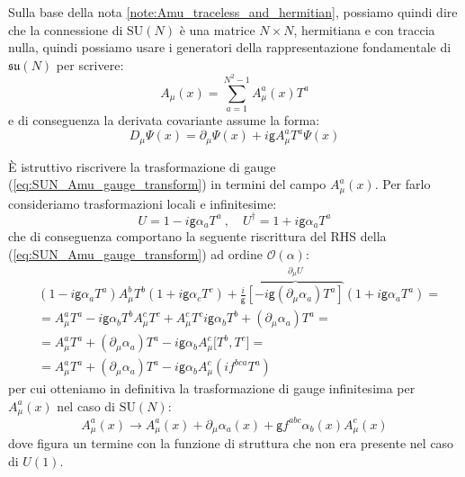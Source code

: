 \documentclass[../main.tex]{subfiles}
\begin{document}
Sulla base della nota \ref{note:Amu_traceless_and_hermitian}, possiamo quindi dire che la connessione di $\textrm{SU}(N)$ è una matrice $N\times N$, hermitiana e con traccia nulla, quindi possiamo usare i generatori della rappresentazione fondamentale di $\mathfrak{su}(N)$ per scrivere:
\begin{equation}
    \boxed{A_\mu(x) = \sum_{a=1}^{N^2-1} A^a_\mu(x)T^a}
    \label{eq:SUN_connection_explicit}
\end{equation}
e di conseguenza la derivata covariante assume la forma:
\begin{equation}
    \boxed{D_\mu\Psi(x) = \partial_\mu\Psi(x) + i\mathsf{g}A^a_\mu T^a\Psi(x)}
    \label{eq:SUN_covder_explicit}
\end{equation}

\begin{exercise}
    È istruttivo riscrivere la trasformazione di gauge (\ref{eq:SUN_Amu_gauge_transform}) in termini del campo $A_\mu^a(x)$. Per farlo consideriamo trasformazioni locali e infinitesime:
    \[
    U = 1-i\mathsf{g}\alpha_aT^a~,\quad U^\dagger = 1+ i\mathsf{g}\alpha_aT^a
    \]
    che di conseguenza comportano la seguente riscrittura del RHS della (\ref{eq:SUN_Amu_gauge_transform}) ad ordine $\mathscr{O}(\alpha)$:
    \begin{align*}
        &(1-i\mathsf{g}\alpha_aT^a)A_\mu^bT^b(1+ i\mathsf{g}\alpha_cT^c) + \frac{i}{\mathsf{g}}\overbrace{[-i\mathsf{g}(\partial_\mu\alpha_a)T^a]}^{\partial_\mu U}(1+ i\mathsf{g}\alpha_aT^a) =\\
        &=A_\mu^aT^a - i\mathsf{g}\alpha_b T^b A_\mu^cT^c + A_\mu^cT^ci\mathsf{g}\alpha_bT^b +(\partial_\mu\alpha_a)T^a =\\
        &=A_\mu^aT^a + (\partial_\mu\alpha_a)T^a - i\mathsf{g}\alpha_b A_\mu^c\big[T^b,T^c\big] = \\
        &=A_\mu^aT^a + (\partial_\mu\alpha_a)T^a -i\mathsf{g}\alpha_b A_\mu^c (if^{bca}T^a)
    \end{align*}
    per cui otteniamo in definitiva la trasformazione di gauge infinitesima per $A_\mu^a(x)$ nel caso di $\textrm{SU}(N)$:
    \begin{equation}
        \boxed{A_\mu^a(x) \rightarrow A_\mu^a(x) + \partial_\mu\alpha_a(x) + \mathsf{g}f^{abc}\alpha_b(x) A_\mu^c(x)}
        \label{eq:SUN_Amu_infinit_gauge_transform}
    \end{equation}
    dove figura un termine con la funzione di struttura che non era presente nel caso di $U(1)$.
\end{exercise}
\end{document}
